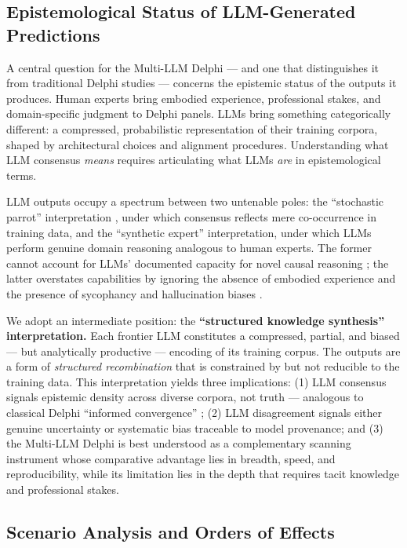 \documentclass[preprint,review,12pt]{elsarticle}
\begin{document}
\subsection{Epistemological Status of LLM-Generated Predictions}
\label{sec:epistemological_status}

A central question for the Multi-LLM Delphi --- and one that distinguishes it from traditional Delphi studies --- concerns the epistemic status of the outputs it produces. Human experts bring embodied experience, professional stakes, and domain-specific judgment to Delphi panels. LLMs bring something categorically different: a compressed, probabilistic representation of their training corpora, shaped by architectural choices and alignment procedures. Understanding what LLM consensus \textit{means} requires articulating what LLMs \textit{are} in epistemological terms.

LLM outputs occupy a spectrum between two untenable poles: the ``stochastic parrot'' interpretation \citep{bender2021parrots}, under which consensus reflects mere co-occurrence in training data, and the ``synthetic expert'' interpretation, under which LLMs perform genuine domain reasoning analogous to human experts. The former cannot account for LLMs' documented capacity for novel causal reasoning \citep{wei2022emergent, bubeck2023sparks}; the latter overstates capabilities by ignoring the absence of embodied experience and the presence of sycophancy and hallucination biases \citep{perez2023sycophancy, sharma2024sycophancy}.

We adopt an intermediate position: the \textbf{``structured knowledge synthesis'' interpretation.} Each frontier LLM constitutes a compressed, partial, and biased --- but analytically productive --- encoding of its training corpus. The outputs are a form of \textit{structured recombination} that is constrained by but not reducible to the training data. This interpretation yields three implications: (1) LLM consensus signals epistemic density across diverse corpora, not truth --- analogous to classical Delphi ``informed convergence'' \citep{linstone1975delphi}; (2) LLM disagreement signals either genuine uncertainty or systematic bias traceable to model provenance; and (3) the Multi-LLM Delphi is best understood as a complementary scanning instrument whose comparative advantage lies in breadth, speed, and reproducibility, while its limitation lies in the depth that requires tacit knowledge and professional stakes.


\subsection{Scenario Analysis and Orders of Effects}
\label{sec:scenario_analysis}
\end{document}
